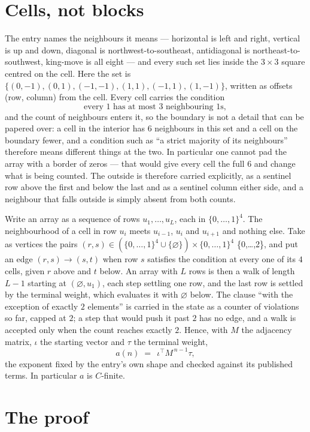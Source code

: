 \documentclass[11pt,a4paper]{article}
\theoremstyle{plain}
\theoremstyle{definition}
\begin{document}
\section{Cells, not blocks}

The entry names the neighbours it means --- horizontal is left and right, vertical is up and
down, diagonal is northwest-to-southeast, antidiagonal is northeast-to-southwest, king-move is
all eight --- and every such set lies inside the $3\times3$ square centred on the cell. Here
the set is $\{(0,-1), (0,1), (-1,-1), (1,1), (-1,1), (1,-1)\}$, written as offsets (row, column) from the cell. Every cell carries
the condition
\[
\text{every 1 has at most 3 neighbouring 1s},
\]
and the count of neighbours enters it, so the boundary is not a detail that can be papered
over: a cell in the interior has $6$ neighbours in this set and a cell on the boundary
fewer, and a condition such as ``a strict majority of its neighbours'' therefore means
different things at the two. In particular one cannot pad the array with a border of zeros ---
that would give every cell the full $6$ and change what is being counted. The outside is
therefore carried
explicitly, as a sentinel row above the first and below the last and as a sentinel column
either side, and a neighbour that falls outside is simply absent from both counts.

Write an array as a sequence of rows $u_1,\dots,u_L$, each in
$\{0,\dots,1\}^{4}$. The neighbourhood of a cell in row $u_i$ meets $u_{i-1}$,
$u_i$ and $u_{i+1}$ and nothing else. Take as vertices the pairs
$(r,s)\in(\{0,\dots,1\}^{4}\cup\{\varnothing\})\times\{0,\dots,1\}^{4}$ \times \{0,\dots,2\},
and put an edge $(r,s)\to(s,t)$ when row $s$ satisfies the condition at every one of its
$4$ cells, given $r$ above and $t$ below. An array with $L$ rows is then a walk of length
$L-1$ starting at $(\varnothing,u_1)$, each step settling one row, and the last row is
settled by the terminal weight, which evaluates it with $\varnothing$ below. The clause ``with the exception of exactly $2$ elements'' is carried in
the state as a counter of violations so far, capped at $2$; a step that would push it past
$2$ has no edge, and a walk is accepted only when the count reaches exactly $2$. Hence,
with $M$ the adjacency matrix, $\iota$ the starting vector and $\tau$ the terminal weight,
\[
a(n)\;=\;\,\iota^{\!\top}M^{\,n-1}\tau ,
\]
the exponent fixed by the entry's own shape and checked against its published terms. In
particular $a$ is $C$-finite.

\section{The proof}
\end{document}
